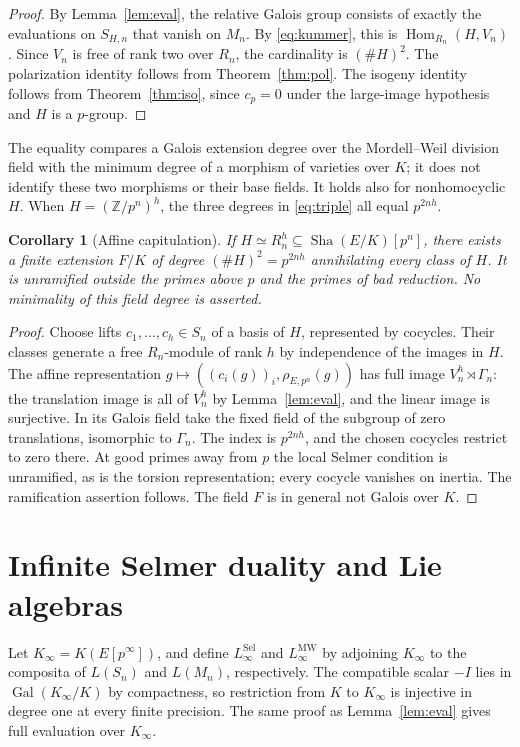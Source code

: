 \documentclass[11pt,a4paper]{article}
\newtheorem{corollary}[theorem]{Corollary}
\theoremstyle{definition}\newtheorem{definition}[theorem]{Definition}
\theoremstyle{remark}\newtheorem{remark}[theorem]{Remark}
\newcommand{\Sha}{\operatorname{\mathrm{Sha}}}
\newcommand{\ZZ}{\mathbb Z}\newcommand{\QQ}{\mathbb Q}\newcommand{\FF}{\mathbb F}
\newcommand{\Gal}{\operatorname{Gal}}\newcommand{\Hom}{\operatorname{Hom}}\newcommand{\End}{\operatorname{End}}\newcommand{\Pic}{\operatorname{Pic}}\newcommand{\NS}{\operatorname{NS}}\newcommand{\Br}{\operatorname{Br}}\newcommand{\Sel}{\operatorname{Sel}}\newcommand{\ord}{\operatorname{ord}}\newcommand{\rk}{\operatorname{rank}}\newcommand{\corank}{\operatorname{corank}}\newcommand{\length}{\operatorname{length}}\newcommand{\Sym}{\operatorname{Sym}}\newcommand{\Cl}{\operatorname{Cl}}\newcommand{\coker}{\operatorname{coker}}\newcommand{\I}{\mathfrak I}\newcommand{\D}{\mathfrak D}\newcommand{\Tdef}{\mathfrak T}
\numberwithin{equation}{section}
\begin{document}
\begin{proof}
By Lemma~\ref{lem:eval}, the relative Galois group consists of exactly the evaluations on $S_{H,n}$ that vanish on $M_n$. By \eqref{eq:kummer}, this is $\Hom_{R_n}(H,V_n)$. Since $V_n$ is free of rank two over $R_n$, the cardinality is $(\#H)^2$. The polarization identity follows from Theorem~\ref{thm:pol}. The isogeny identity follows from Theorem~\ref{thm:iso}, since $c_p=0$ under the large-image hypothesis and $H$ is a $p$-group.
\end{proof}
The equality compares a Galois extension degree over the Mordell--Weil division field with the minimum degree of a morphism of varieties over $K$; it does not identify these two morphisms or their base fields. It holds also for nonhomocyclic $H$. When $H=(\ZZ/p^n)^h$, the three degrees in \eqref{eq:triple} all equal $p^{2nh}$.

\begin{corollary}[Affine capitulation]\label{cor:cap}
If $H\simeq R_n^h\subseteq\Sha(E/K)[p^n]$, there exists a finite extension $F/K$ of degree $(\#H)^2=p^{2nh}$ annihilating every class of $H$. It is unramified outside the primes above $p$ and the primes of bad reduction. No minimality of this field degree is asserted.
\end{corollary}
\begin{proof}
Choose lifts $c_1,\ldots,c_h\in S_n$ of a basis of $H$, represented by cocycles. Their classes generate a free $R_n$-module of rank $h$ by independence of the images in $H$. The affine representation $g\mapsto((c_i(g))_i,\rho_{E,p^n}(g))$ has full image $V_n^h\rtimes\Gamma_n$: the translation image is all of $V_n^h$ by Lemma~\ref{lem:eval}, and the linear image is surjective. In its Galois field take the fixed field of the subgroup of zero translations, isomorphic to $\Gamma_n$. The index is $p^{2nh}$, and the chosen cocycles restrict to zero there. At good primes away from $p$ the local Selmer condition is unramified, as is the torsion representation; every cocycle vanishes on inertia. The ramification assertion follows. The field $F$ is in general not Galois over $K$.
\end{proof}

\section{Infinite Selmer duality and Lie algebras}
Let $K_\infty=K(E[p^\infty])$, and define $L_\infty^{\mathrm{Sel}}$ and $L_\infty^{\mathrm{MW}}$ by adjoining $K_\infty$ to the composita of $L(S_n)$ and $L(M_n)$, respectively. The compatible scalar $-I$ lies in $\Gal(K_\infty/K)$ by compactness, so restriction from $K$ to $K_\infty$ is injective in degree one at every finite precision. The same proof as Lemma~\ref{lem:eval} gives full evaluation over $K_\infty$.
\end{document}
